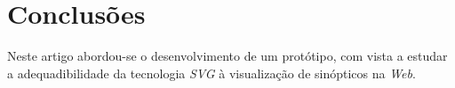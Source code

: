 \documentclass[twocolumn,twoside,11pt,a4paper]{article}
\newcommand{\class}[1]{{\normalfont\slshape #1\/}}
\newcommand{\svg}{\class{SVG}}
\begin{document}


\section{Conclusões}\label{sec:conclusions}

Neste artigo abordou-se o desenvolvimento de um protótipo, com vista a
estudar a adequadibilidade da tecnologia \svg{} à visualização de
sinópticos na \textit{Web}.

\lipsum[8]


\renewcommand{\bibname}{Referências}
%
%

%


\end{document}
